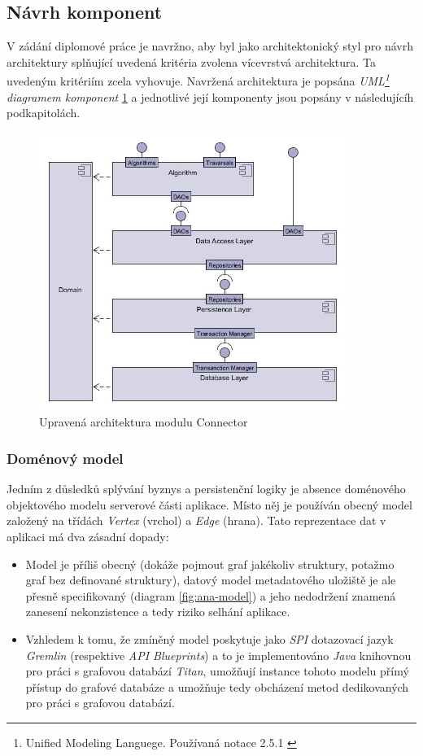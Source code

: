 \subsection{Návrh komponent}
\label{sec:des_components}
V zádání diplomové práce je navržno, aby byl jako architektonický styl pro návrh architektury splňující uvedená kritéria zvolena vícevrstvá architektura. Ta uvedeným kritériím zcela vyhovuje. Navržená architektura je popsána \textit{UML\footnote{Unified Modeling Languege. Používaná notace 2.5.1 \cite{UML17}} diagramem komponent} \ref{fig:des-connector} a jednotlivé její komponenty jsou popsány v následujícíh podkapitolách.

\begin{figure}
\begin{center}
\includegraphics[width=10cm]{figures/connector_modules}
\caption{Upravená architektura modulu Connector}
\label{fig:des-connector}
\end{center}
\end{figure}

\subsubsection{Doménový model}
\label{sec:des_domain}
Jedním z důsledků splývání byznys a persistenční logiky je absence doménového objektového modelu serverové části aplikace. Místo něj je používán obecný model založený na třídách \textit{Vertex} (vrchol) a \textit{Edge} (hrana). Tato reprezentace dat v aplikaci má dva zásadní dopady:

\begin{itemize}
   \item Model je příliš obecný (dokáže pojmout graf jakékoliv struktury, potažmo graf bez definované struktury), datový model metadatového uložiště je ale přesně specifikovaný (diagram \ref{fig:ana-model}) a jeho nedodržení znamená zanesení nekonzistence a tedy riziko selhání aplikace.
   \item Vzhledem k tomu, že zmíněný model poskytuje jako \textit{SPI} dotazovací jazyk \textit{Gremlin} (respektive \textit{API Blueprints}) a to je implementováno \textit{Java} knihovnou pro práci s grafovou databází \textit{Titan}, umožňují instance tohoto modelu přímý přístup do grafové databáze a umožňuje tedy obcházení metod dedikovaných pro práci s grafovou databází.
\end{itemize}

